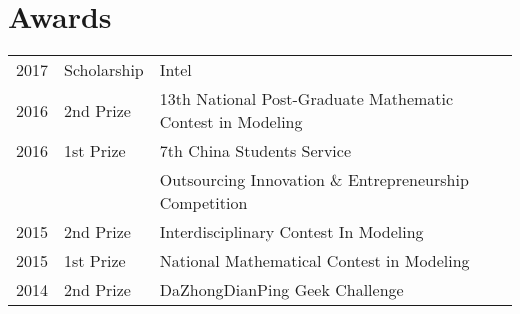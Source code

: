 \documentclass[]{deedy-resume-openfont}
\begin{document}
\begin{minipage}[t]{0.73\textwidth}

\section{Awards} 
\begin{tabular}{rll}
2017         & Scholarship  & Intel \\
2016	     & 2nd Prize  & 13th National Post-Graduate Mathematic Contest in Modeling \\
2016	     & 1st Prize  & 7th China Students Service \\
 & & Outsourcing Innovation \& Entrepreneurship Competition \\
2015	     & 2nd Prize  & Interdisciplinary Contest In Modeling \\
2015         & 1st Prize & National Mathematical Contest in Modeling \\
2014	     & 2nd Prize  & DaZhongDianPing Geek Challenge \\
\end{tabular}
\sectionsep


% 
% 

\end{minipage} 
\end{document}

